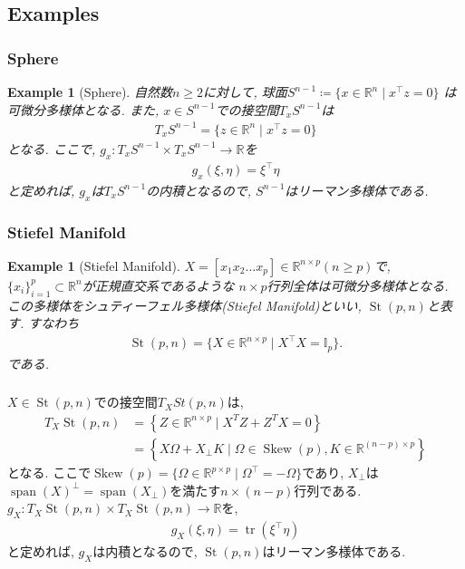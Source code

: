 \documentclass[dvipdfmx,11pt]{beamer}		%
\newtheorem{exam}[defi]{Example}
\newcommand{\R}{\mathbb{R}}
\begin{document}
    \subsection{Examples}
    \begin{frame}\frametitle{Sphere}
        \begin{exam}[Sphere]
            自然数$n\geq2$に対して, 球面$S^{n - 1}\coloneqq\{x\in\R^n\mid x^{\top}z = 0\}$
            は可微分多様体となる. また, $x\in S^{n - 1}$での接空間$T_xS^{n-1}$は
            \begin{align*}
                T_xS^{n - 1} = \{z\in\R^n\mid x^{\top}z = 0\}
            \end{align*}
            となる. ここで, $g_x : T_xS^{n - 1}\times T_xS^{n - 1}\to\R$を
            \begin{align*}
                g_x(\xi, \eta) = \xi^{\top}\eta
            \end{align*}
            と定めれば, $g_x$は$T_xS^{n-1}$の内積となるので, $S^{n - 1}$はリーマン多様体である.
        \end{exam}
    \end{frame}
    \begin{frame}\frametitle{Stiefel Manifold}
        \begin{exam}[Stiefel Manifold]
            $X = [x_1x_2\ldots x_p]\in\R^{n\times p}(n\geq p)$で, $\{x_i\}_{i = 1}^p\subset\R^n$が正規直交系であるような
            $n\times p$行列全体は可微分多様体となる. この多様体をシュティーフェル多様体(Stiefel Manifold)といい, 
            $\operatorname{St}(p, n)$と表す. すなわち
            \begin{align*}
                \operatorname{St}(p, n) = \{X\in\R^{n\times p}\mid X^{\top}X = \mathbb{I}_{p}\}.
            \end{align*}
            である.
        \end{exam}
    \end{frame}

    \begin{frame}\frametitle{}
        $X\in\operatorname{St}(p, n)$での接空間$T_{X}St(p, n)$は, 
        \begin{align*}
            T_{X} \operatorname{St}(p, n)&=\left\{Z \in \mathbb{R}^{n \times p}\mid X^{T} Z+Z^{T} X=0\right\}\\
                                         &= \left\{X \Omega+X_{\perp} K\mid \Omega\in\operatorname{Skew}(p), K \in \mathbb{R}^{(n-p) \times p}\right\}
        \end{align*}
        となる. ここで$\operatorname{Skew}(p) = \{\Omega\in\R^{p\times p}\mid \Omega^{\top} = -\Omega\}$であり, 
        $X_{\perp}$は$\operatorname{span}(X)^{\perp} = \operatorname{span}(X_{\perp})$を満たす$n\times (n - p)$行列である.
        $g_{X} : T_{X}\operatorname{St}(p, n)\times T_{X}\operatorname{St}(p, n)\to\R$を,
        \begin{align*}
            g_{X}(\xi, \eta) = \operatorname{tr}(\xi^{\top} \eta)
        \end{align*}
        と定めれば, $g_{X}$は内積となるので, $\operatorname{St}(p, n)$はリーマン多様体である. 
    \end{frame}
\end{document}
